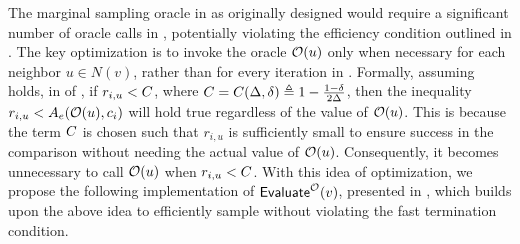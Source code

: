 The marginal sampling oracle in  as originally designed would require a significant number of oracle calls in , potentially violating the efficiency condition outlined in . 
The key optimization is to invoke the oracle $\mathcal{O}(u)$ only when necessary for each neighbor $u \in N(v)$, rather than for every iteration in .
Formally, assuming  holds, in  of , if $r_{i,u} < C$, where $C = C(\Delta, \delta) \triangleq 1 - \frac{1-\delta}{2\Delta}$, then the inequality $r_{i,u}<A_e(\mathcal{O}(u),c_i)$ will hold true regardless of the value of $\mathcal{O}(u)$. This is because the term $C$ is chosen such that $r_{i,u}$ is sufficiently small to ensure success in the comparison without needing the actual value of $\mathcal{O}(u)$. Consequently, it becomes unnecessary to call $\mathcal{O}(u)$ when $r_{i,u} < C$.
With this idea of optimization, we propose the following implementation of $\textnormal{\textsf{Evaluate}}^{\mathcal{O}}(v)$, presented in , which builds upon the above idea to efficiently sample without violating the fast termination condition.




